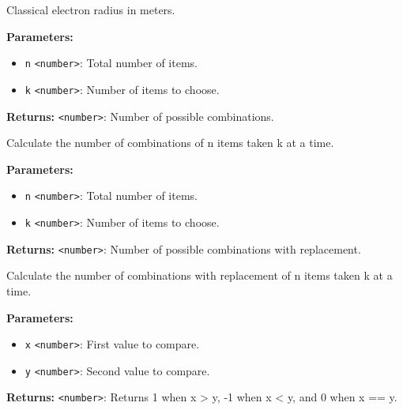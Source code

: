 \documentclass[12pt,a4paper]{article}
\begin{document}
\noindent Classical electron radius in meters.

\vspace{5mm}
\noindent {}


\noindent \textbf{Parameters:}
\begin{itemize}
  \item \texttt{n} \texttt{<number>}: Total number of items.
  \item \texttt{k} \texttt{<number>}: Number of items to choose.
\end{itemize}

\noindent \textbf{Returns:} \texttt{<number>}: Number of possible combinations.

\noindent Calculate the number of combinations of n items taken k at a time.

\vspace{5mm}
\noindent {}


\noindent \textbf{Parameters:}
\begin{itemize}
  \item \texttt{n} \texttt{<number>}: Total number of items.
  \item \texttt{k} \texttt{<number>}: Number of items to choose.
\end{itemize}

\noindent \textbf{Returns:} \texttt{<number>}: Number of possible combinations with replacement.

\noindent Calculate the number of combinations with replacement of n items taken k at a time.

\vspace{5mm}
\noindent {}


\noindent \textbf{Parameters:}
\begin{itemize}
  \item \texttt{x} \texttt{<number>}: First value to compare.
  \item \texttt{y} \texttt{<number>}: Second value to compare.
\end{itemize}

\noindent \textbf{Returns:} \texttt{<number>}: Returns 1 when x > y, -1 when x < y, and 0 when x == y.
\end{document}
